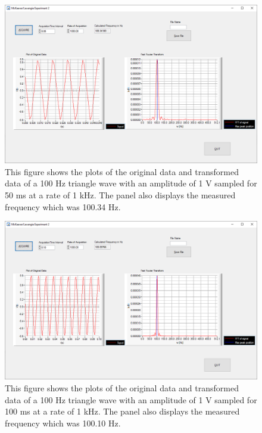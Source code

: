 \documentclass{article}
\begin{document}
\begin{figure}[H]
\includegraphics[scale=0.4,center]{Triangle50ms.png}
\caption{This figure shows the plots of the original data and transformed data of a 100 Hz triangle wave with an amplitude of 1 V sampled for 50 ms at a rate of 1 kHz.  The panel also displays the measured frequency which was 100.34 Hz.}
\end{figure}

\begin{figure}[H]
\includegraphics[scale=0.4,center]{Triangle100ms.png}
\caption{This figure shows the plots of the original data and transformed data of a 100 Hz triangle wave with an amplitude of 1 V sampled for 100 ms at a rate of 1 kHz.  The panel also displays the measured frequency which was 100.10 Hz.}
\end{figure}
\end{document}
